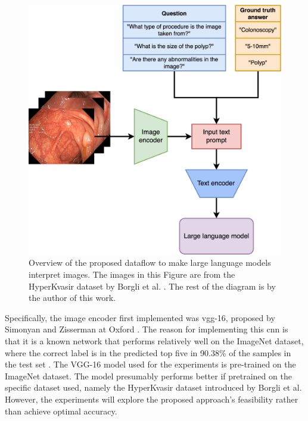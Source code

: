         \begin{figure}[htb]
            \centerline{
            \includegraphics[width=\textwidth]{images/alpaca_vision.png}}
            \caption[Overview of the proposed dataflow to make large language models interpret images.]{Overview of the proposed dataflow to make large language models interpret images. The images in this Figure are from the HyperKvasir dataset by Borgli et al. \cite{borgliHyperKvasirComprehensiveMulticlass2020}. The rest of the diagram is by the author of this work.}
            \label{fig:alpaca_vision}
        \end{figure}


        Specifically, the image encoder first implemented was \gls{vgg}-16, proposed by Simonyan and Zisserman at Oxford \cite{simonyanVeryDeepConvolutional2015}. The reason for implementing this \gls{cnn} is that it is a known network that performs relatively well on the ImageNet dataset, where the correct label is in the predicted top five in 90.38\% of the samples in the test set \cite{Vgg16TorchvisionMain}. The VGG-16 model used for the experiments is pre-trained on the ImageNet \cite{dengImageNetLargeScaleHierarchical2009} dataset. The model presumably performs better if pretrained on the specific dataset used, namely the HyperKvasir dataset \cite{borgliHyperKvasirComprehensiveMulticlass2020} introduced by Borgli et al. However, the experiments will explore the proposed approach's feasibility rather than achieve optimal accuracy.

